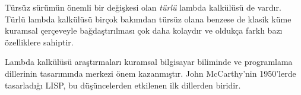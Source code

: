 \begin{digress}
Türsüz sürümün önemli bir değişkesi olan \emph{türlü} lambda kalkülüsü de
vardır. Türlü lambda kalkülüsü birçok bakımdan türsüz olana benzese de klasik
küme kuramsal çerçeveyle bağdaştırılması çok daha kolaydır ve oldukça farklı
bazı özelliklere sahiptir.

Lambda kalkülüsü araştırmaları kuramsal bilgisayar biliminde ve programlama
dillerinin tasarımında merkezi önem kazanmıştır. John McCarthy'nin 1950'lerde
tasarladığı LISP, bu düşüncelerden etkilenen ilk dillerden biridir.
\end{digress}

